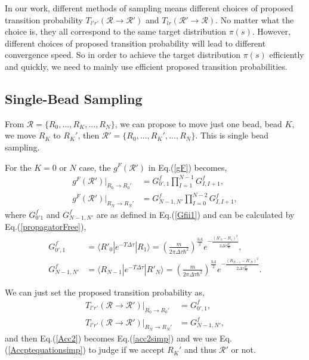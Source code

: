 \documentclass[12pt,letterpaper,UTF8]{report}
\begin{document}
In our work, different methods of sampling means different choices of proposed transition probability $T_{l'r'}(\mathcal{R} \rightarrow \mathcal{R}')$ and $T_{lr}(\mathcal{R}' \rightarrow \mathcal{R}) $. No matter what the choice is, they all correspond to the same target distribution $\pi(s)$.  However, different choices of proposed transition probability will lead to different convergence speed. So in order to achieve the target distribution $\pi(s)$ efficiently and quickly, we need to mainly use efficient proposed transition probabilities.

\subsection{Single-Bead Sampling}
\label{Sample1bead}

From $\mathcal{R}=\{ R_0, ..., R_K, ..., R_N \}$, we can propose to move just one bead, bead $K$, we move $R_K$ to $R_K'$, then $\mathcal{R}'=\{ R_0, ..., R_K', ..., R_N \}$. This is single bead sampling.

For the $K = 0$ or $N$ case, the $g^F(\mathcal{R}')$ in Eq.(\ref{gF}) becomes,
\begin{align}
g^F(\mathcal{R}')|_{R_0 \rightarrow R_0'} &= G^f_{0', 1} \prod_{I=1}^{N-1} G^f_{I, I+1} , \label{gFRnew1bead0} \\
g^F(\mathcal{R}')|_{R_N \rightarrow R_N'} &= G^f_{N-1, N'} \prod_{I=0}^{N-2} G^f_{I, I+1} , \label{gFRnew1beadN}
\end{align}
where $G^f_{0' 1 }$ and $G^f_{N-1, N'}$ are as defined in Eq.(\ref{Gfii1}) and can be calculated by Eq.(\ref{propagatorFree}),
\begin{align}
G^f_{0', 1}  &=  \langle R'_{0} | e^{-T \Delta \tau}  | R_{1} \rangle =  \left( \frac{m}{2\pi \Delta \tau \hbar^2} \right)^{\frac{3A}{2}}
 e^{  -\frac{ ({R'_{0}}-{R_1})^2 }{2 \Delta \tau  \frac{\hbar^2}{m}  }}   ,
\label{gFRnew1bead0a} \\
G^f_{N-1, N'}  &=  \langle R_{N-1} | e^{-T \Delta \tau}  | R'_{N} \rangle
=  \left( \frac{m}{2\pi \Delta \tau \hbar^2} \right)^{\frac{3A}{2}}
 e^{  -\frac{ (R_{N-1}-R'_{N})^2 }{2 \Delta \tau \frac{\hbar^2}{m} }  }  .
\label{gFRnew1beadKa}
\end{align}

We can just set the proposed transition probability as,
\begin{align}
T_{l'r'}(\mathcal{R} \rightarrow \mathcal{R}') |_{R_0 \rightarrow R_0'} &=
G^f_{0', 1},
 \label{Tlrnew0} \\
T_{l'r'}(\mathcal{R} \rightarrow \mathcal{R}') |_{R_N \rightarrow R_N'} &=
G^f_{N-1, N'},
 \label{TlrnewN}
\end{align}
and then Eq.(\ref{Acc2}) becomes Eq.(\ref{acc2simp}) and we use Eq.(\ref{Accptequationsimp}) to judge if we accept $R_K'$ and thus $\mathcal{R}'$ or not.
\end{document}
